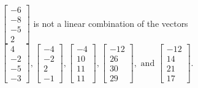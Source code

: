 \begin{exercise}
\begin{exerciseStatement}
  \end{exerciseStatement}
  \begin{exerciseAnswer}
   \(\left[\begin{array}{c}
-6 \\
-8 \\
-5 \\
2
\end{array}\right]\) 
  	 is not  
	a linear combination of the vectors \(\left[\begin{array}{c}
4 \\
-2 \\
-5 \\
-3
\end{array}\right] , \left[\begin{array}{c}
-4 \\
-2 \\
2 \\
-1
\end{array}\right] , \left[\begin{array}{c}
-4 \\
10 \\
11 \\
11
\end{array}\right] , \left[\begin{array}{c}
-12 \\
26 \\
30 \\
29
\end{array}\right] , \text{ and } \left[\begin{array}{c}
-12 \\
14 \\
21 \\
17
\end{array}\right]\).

	
  


  \end{exerciseAnswer}
\end{exercise}
